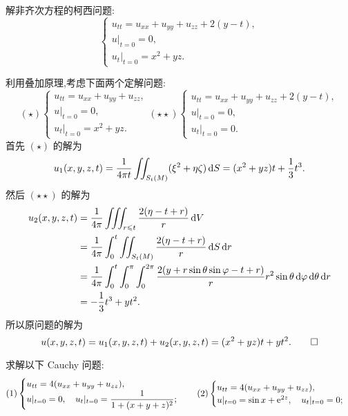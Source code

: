 \begin{exercise}[8]
  解非齐次方程的柯西问题:
  \[\begin{cases}
    u_{tt} = u_{xx}+u_{yy}+u_{zz}+2(y-t), \\
    u|_{t=0} = 0, \\
    u_t|_{t=0} = x^2+yz.
  \end{cases}\]
\end{exercise}

\begin{solve}
  利用叠加原理,考虑下面两个定解问题:
  \[(\star)
  \begin{cases}
    u_{tt}=u_{xx}+u_{yy}+u_{zz}, \\
    u|_{t=0}=0, \\
    u_t|_{t=0}=x^2+yz.
  \end{cases}
  (\star\star)
  \begin{cases}
    u_{tt} = u_{xx}+u_{yy}+u_{zz}+2(y-t), \\
    u|_{t=0}=0, \\
    u_t|_{t=0}=0.
  \end{cases}\]
  首先 $(\star)$ 的解为
  \[u_1(x,y,z,t) = \frac{1}{4\pi t}\iint_{S_t(M)}(\xi^2+\eta\zeta)\mathop{}\!\mathrm{d} S
    = (x^2+yz)t+\frac{1}{3}t^3.\]
  然后 $(\star\star)$ 的解为
  \[\begin{split}
    u_2(x,y,z,t)
    & = \frac{1}{4\pi}\iiint_{r\leqslant t}\frac{2(\eta-t+r)}{r}\mathop{}\!\mathrm{d} V \\
    & = \frac{1}{4\pi}\int_0^t\iint_{S_t(M)}\frac{2(\eta-t+r)}{r}\mathop{}\!\mathrm{d} S\mathop{}\!\mathrm{d} r \\
    & = \frac{1}{4\pi}\int_0^t\int_0^{\pi}\int_0^{2\pi}
      \frac{2(y+r\sin\theta\sin\varphi-t+r)}{r}r^2\sin\theta\mathop{}\!\mathrm{d}\varphi\mathop{}\!\mathrm{d}\theta\mathop{}\!\mathrm{d} r \\
    & = -\frac{1}{3}t^3+yt^2.
  \end{split}\]
  所以原问题的解为
  \[u(x,y,z,t) = u_1(x,y,z,t)+u_2(x,y,z,t)=(x^2+yz)t+yt^2.\qedhere\]
\end{solve}


\begin{exercise}
	求解以下 Cauchy 问题:
	$$(1)\begin{cases}u_{tt}=4(u_{xx}+u_{yy}+u_{zz}),\\u|_{t=0}=0,\quad u_{t}|_{t=0}=\dfrac{1}{1+(x+y+z)^2};\end{cases}\quad(2)\begin{cases}u_{tt}=4(u_{xx}+u_{yy}+u_{zz}),\\u|_{t=0}=\sin x+\mathrm{e}^{2z},\quad u_{t}|_{t=0}=0;\end{cases}$$
\end{exercise}

